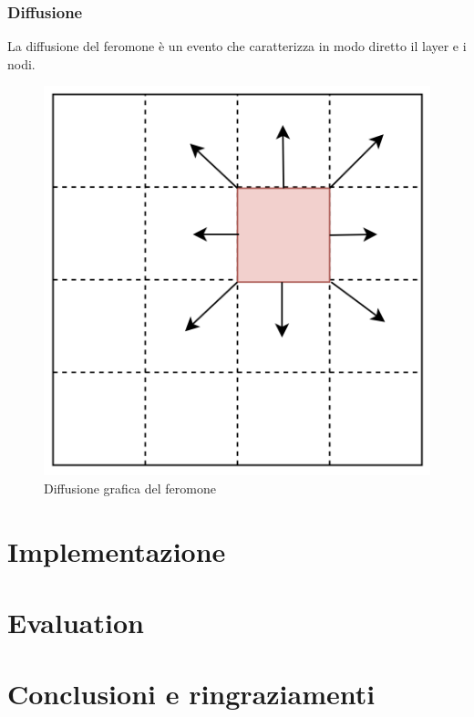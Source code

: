 \documentclass[12pt,a4paper,openright,twoside]{book}
\begin{document}
\subsection{Diffusione}
La diffusione del feromone è un evento che caratterizza in modo diretto il layer e i nodi. 
\begin{figure}[h!]
    \centering
    \includegraphics[width=.7\linewidth]{figures/diffusione.png}
    \caption{Diffusione grafica del feromone}\label{fig:diffusion}
\end{figure}

%

\chapter{Implementazione}

\chapter{Evaluation}
\chapter{Conclusioni e ringraziamenti}

\backmatter\nocite{*} %



\end{document}
